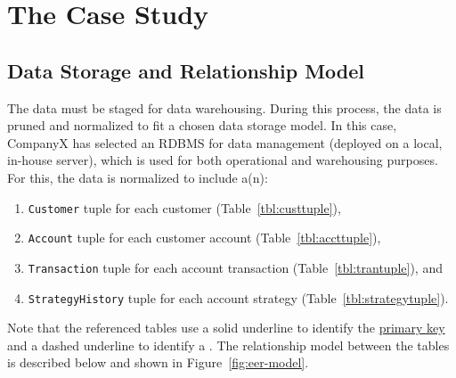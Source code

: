 \section{The Case Study}

\subsection{Data Storage and Relationship Model}
The data must be staged for data warehousing. During this process, the data is pruned and normalized to fit a chosen data storage model. In this case, CompanyX has selected an RDBMS for data management (deployed on a local, in-house server), which is used for both operational and warehousing purposes. For this, the data is normalized to include a(n):
\begin{enumerate}
 \item \texttt{Customer} tuple for each customer (Table~\ref{tbl:custtuple}),
 \item \texttt{Account} tuple for each customer account (Table~\ref{tbl:accttuple}),
 \item \texttt{Transaction} tuple for each account transaction (Table~\ref{tbl:trantuple}), and
 \item \texttt{StrategyHistory} tuple for each account strategy (Table~\ref{tbl:strategytuple}).
\end{enumerate}
Note that the referenced tables use a solid underline to identify the \underline{primary key} and a dashed underline to identify a . The relationship model between the tables is described below and shown in Figure~\ref{fig:eer-model}. 

